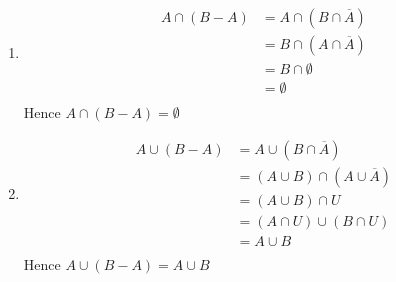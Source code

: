 \documentclass[12pt letter]{report}
\begin{document}
{\begin{enumerate}
    \item
          \begin{align*}
            A \cap \left( B - A \right) & =  A \cap \left( B \cap \overline{A} \right) \tag*{Definition of Difference} \\
                                        & = B \cap \left( A \cap \overline{A} \right) \tag*{By Second Associative Law} \\
                                        & = B \cap \emptyset \tag*{By Second Complement Law}                           \\
                                        & = \emptyset \tag*{By Second Domination Law}                                  \\
          \end{align*}
          Hence $A \cap \left( B - A \right) = \emptyset $

    \item
          \begin{align*}
            A \cup \left( B - A \right) & = A \cup \left( B \cap \overline{A} \right)  \tag*{Definition of Difference}                       \\
                                        & = \left( A \cup B \right) \cap \left( A \cup \overline{A} \right) \tag*{By First Distributive Law} \\
                                        & = \left( A \cup B \right) \cap U  \tag*{By First Complement Law}                                   \\
                                        & = \left( A \cap U \right) \cup \left( B \cap U  \right) \tag*{By Second
            Distributive Law}                                                                                                                \\
                                        & = A \cup B \tag*{By First Identity Law}                                                            \\
          \end{align*}
          Hence $A \cup \left( B - A \right) = A \cup B $

  \end{enumerate}
}

\end{document}

